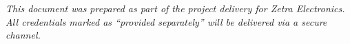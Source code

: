 \documentclass[12pt,a4paper]{article}
\begin{document}
\vspace{1.5em}
\begin{center}
\end{center}
\vspace{0.8em}

\begin{center}
\textit{\small This document was prepared as part of the project delivery for Zetra Electronics.\\
All credentials marked as ``provided separately'' will be delivered via a secure channel.}
\end{center}
\end{document}
